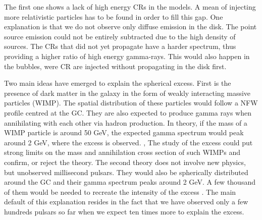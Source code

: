 The first one shows a lack of high energy CRs in the models. A mean of injecting more relativistic particles has to be found in order to fill this gap. One explanation is that we do not observe only diffuse emission in the disk. The point source emission could not be entirely subtracted due to the high density of sources. The CRs that did not yet propagate have a harder spectrum, thus providing a higher ratio of high energy gamma-rays. This would also happen in the bubbles, were CR are injected without propagating in the disk first.

Two main ideas have emerged to explain the spherical excess.
First is the presence of dark matter in the galaxy in the form of weakly interacting massive particles (WIMP). The spatial distribution of these particles would follow a NFW profile centred at the GC. They are also expected to produce gamma rays when annihilating with each other via hadron production. In theory, if the mass of a WIMP particle is around 50 GeV, the expected gamma spectrum would peak around 2 GeV, where the excess is observed. \cite{Calore2015}, \cite{Fermi2017}
The study of the excess could put strong limits on the mass and annihilation cross section of such WIMPs and confirm, or reject the theory.
The second theory does not involve new physics, but unobserved millisecond pulsars. They would also be spherically distributed around the GC and their gamma spectrum peaks around 2 GeV. A few thousand of them would be needed to recreate the intensity of the excess \cite{Fermi2017}. The main default of this explanation resides in the fact that we have observed only a few hundreds pulsars so far when we expect ten times more to explain the excess.















